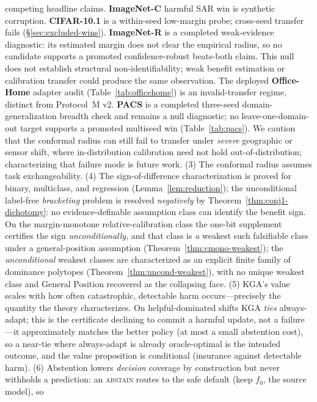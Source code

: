 \documentclass[conference]{IEEEtran}
\theoremstyle{plain}
\theoremstyle{definition}
\begin{document}
competing headline claims. \textbf{ImageNet-C} harmful SAR win is synthetic corruption.
\textbf{CIFAR-10.1} is a within-seed low-margin probe; cross-seed transfer fails
(\S\ref{sec:excluded-wins}). \textbf{ImageNet-R} is a completed weak-evidence diagnostic: its
estimated margin does not clear the empirical radius, so no candidate supports a promoted
confidence-robust beats-both claim. This null does not establish structural non-identifiability;
weak benefit estimation or calibration transfer could produce the same observation. The deployed
\textbf{Office-Home} adapter audit (Table~\ref{tab:officehome}) is an invalid-transfer regime,
distinct from Protocol~M v2.
\textbf{PACS} is a completed three-seed domain-generalization breadth check and remains a null
diagnostic; no leave-one-domain-out target supports a promoted multiseed win (Table~\ref{tab:pacs}).
We caution that the conformal radius can still fail to transfer under \emph{severe} geographic or
sensor shift, where in-distribution calibration need not hold out-of-distribution; characterizing
that failure mode is future work.
(3) The conformal radius assumes task exchangeability.
(4) The sign-of-difference characterization is proved for binary, multiclass, and
regression (Lemma~\ref{lem:reduction}); the unconditional label-free \emph{bracketing}
problem is resolved \emph{negatively} by Theorem~\ref{thm:conj1-dichotomy}: no
evidence-definable assumption class can identify the benefit sign. On the margin-monotone
relative-calibration class the one-bit supplement certifies the sign \emph{unconditionally}, and
that class is \emph{a} weakest such falsifiable class under a general-position assumption
(Theorem~\ref{thm:cmono-weakest}); the \emph{unconditional} weakest classes are characterized as an
explicit finite family of dominance polytopes (Theorem~\ref{thm:uncond-weakest}), with no unique
weakest class and General Position recovered as the collapsing face.
(5) \textsc{KGA}'s value scales with how often catastrophic, detectable harm
occurs---precisely the quantity the theory characterizes. On helpful-dominated shifts
\textsc{KGA} \emph{ties} always-adapt; this is the certificate declining to commit a harmful update,
not a failure---it approximately matches the better policy (at most a small abstention cost), so a
near-tie where always-adapt is already oracle-optimal is the intended outcome, and the value proposition is
conditional (insurance against detectable harm).
(6) Abstention lowers \emph{decision} coverage by construction but never withholds a
prediction: an \textsc{abstain} routes to the safe default (keep $f_0$, the source model), so
\end{document}
